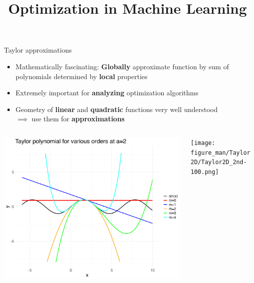 \documentclass[11pt,compress,t,notes=noshow, xcolor=table]{beamer}
\title{Optimization in Machine Learning}
\date{}
\begin{document}
\lecture{\inserttitle}
\sloppy


\begin{vbframe}{Taylor approximations}

\begin{itemize}
    \item Mathematically fascinating: \textbf{Globally} approximate function by sum of polynomials determined by \textbf{local} properties
    \item Extremely important for \textbf{analyzing} optimization algorithms
    \item Geometry of \textbf{linear} and \textbf{quadratic} functions very well understood \\ $\implies$ use them for \textbf{approximations}
\end{itemize}

\begin{columns}
\begin{column}{0.45\textwidth}
\includegraphics[width=\columnwidth]{figure_man/taylor_univariate.png}
\end{column}
\begin{column}{0.55\textwidth}
\texttt{[image: figure\_man/Taylor2D/Taylor2D\_2nd-100.png]}
\end{column}
\end{columns}


\end{vbframe}
\end{document}
